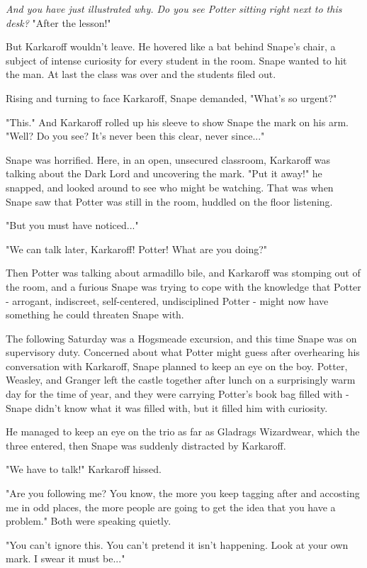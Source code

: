 \documentclass[a4paper,11pt]{article}
\begin{document}
\emph{And you have just illustrated why. Do you see Potter sitting right next to this desk?} "After the lesson!"

But Karkaroff wouldn't leave. He hovered like a bat behind Snape's chair, a subject of intense curiosity for every student in the room. Snape wanted to hit the man. At last the class was over and the students filed out.

Rising and turning to face Karkaroff, Snape demanded, "What's so urgent?"

"This." And Karkaroff rolled up his sleeve to show Snape the mark on his arm. "Well? Do you see? It's never been this clear, never since..."

Snape was horrified. Here, in an open, unsecured classroom, Karkaroff was talking about the Dark Lord and uncovering the mark. "Put it away!" he snapped, and looked around to see who might be watching. That was when Snape saw that Potter was still in the room, huddled on the floor listening.

"But you must have noticed..."

"We can talk later, Karkaroff! Potter! What are you doing?"

Then Potter was talking about armadillo bile, and Karkaroff was stomping out of the room, and a furious Snape was trying to cope with the knowledge that Potter - arrogant, indiscreet, self-centered, undisciplined Potter - might now have something he could threaten Snape with.

The following Saturday was a Hogsmeade excursion, and this time Snape was on supervisory duty. Concerned about what Potter might guess after overhearing his conversation with Karkaroff, Snape planned to keep an eye on the boy. Potter, Weasley, and Granger left the castle together after lunch on a surprisingly warm day for the time of year, and they were carrying Potter's book bag filled with - Snape didn't know what it was filled with, but it filled him with curiosity.

He managed to keep an eye on the trio as far as Gladrags Wizardwear, which the three entered, then Snape was suddenly distracted by Karkaroff.

"We have to talk!" Karkaroff hissed.

"Are you following me? You know, the more you keep tagging after and accosting me in odd places, the more people are going to get the idea that you have a problem." Both were speaking quietly.

"You can't ignore this. You can't pretend it isn't happening. Look at your own mark. I swear it must be..."
\end{document}
